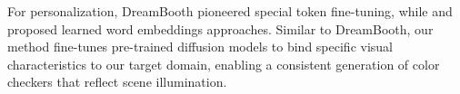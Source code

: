 \vspace{3pt}  
% 
For personalization, DreamBooth \cite{ruiz2022dreambooth} pioneered special token fine-tuning, while \citeauthor{gal2022image} \cite{gal2022image} and \citeauthor{voynov2023P+} \cite{voynov2023P+} proposed learned word embeddings approaches. Similar to DreamBooth, our method fine-tunes pre-trained diffusion models to bind specific visual characteristics to our target domain, enabling a consistent generation of color checkers that reflect scene illumination.
